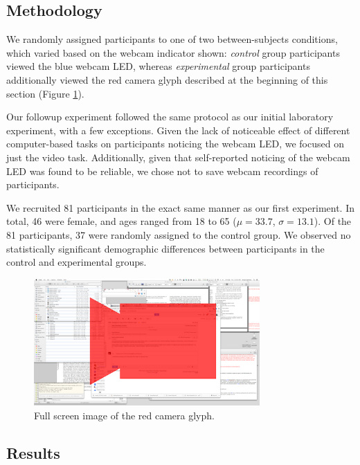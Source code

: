 \documentclass{sigchi}
\begin{document}
\subsection{Methodology}
We randomly assigned participants to one of two between-subjects conditions, which varied based on the webcam indicator shown: {\it control} group participants viewed the blue webcam LED, whereas {\it experimental} group participants additionally viewed the red camera glyph described at the beginning of this section (Figure \ref{glyph}).

Our followup experiment followed the same protocol as our initial laboratory experiment, with a few exceptions. Given the lack of noticeable effect of different computer-based tasks on participants noticing the webcam LED, we focused on just the video task. Additionally, given that self-reported noticing of the webcam LED was found to be reliable, we chose not to save webcam recordings of participants.

We recruited 81 participants in the exact same manner as our first experiment. In total, 46 were female, and ages ranged from 18 to 65 ($\mu = 33.7$, $\sigma = 13.1$). Of the 81 participants, 37 were randomly assigned to the control group. We observed no statistically significant demographic differences between participants in the control and experimental groups.



\begin{figure}
\centering
\includegraphics[width=3.4in]{redglyph-small.png}
\caption{Full screen image of the red camera glyph.}
\label{glyph}
\end{figure}

\subsection{Results}
\end{document}
